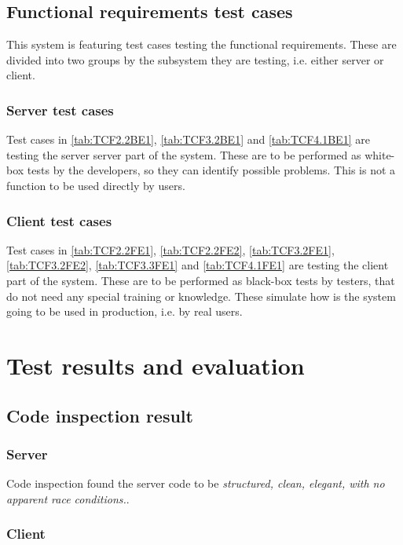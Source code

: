 \documentclass[11pt]{book}
\begin{document}
\subsection{Functional requirements test cases}

This system is featuring test cases testing the functional requirements. These are divided into two groups by the subsystem they are testing, i.e. either server or client.

\subsubsection{Server test cases}

Test cases in \ref{tab:TCF2.2BE1}, \ref{tab:TCF3.2BE1} and \ref{tab:TCF4.1BE1} are testing the server server part of the system. These are to be performed as white-box tests by the developers, so they can identify possible problems. This is not a function to be used directly by users.

\subsubsection{Client test cases} \label{sec:fe-test-cases}

Test cases in \ref{tab:TCF2.2FE1}, \ref{tab:TCF2.2FE2}, \ref{tab:TCF3.2FE1}, \ref{tab:TCF3.2FE2}, \ref{tab:TCF3.3FE1} and \ref{tab:TCF4.1FE1} are testing the client part of the system. These are to be performed as black-box tests by testers, that do not need any special training or knowledge. These simulate how is the system going to be used in production, i.e. by real users.

\section{Test results and evaluation}

\subsection{Code inspection result}

\subsubsection{Server}

Code inspection found the server code to be \emph{structured, clean, elegant, with no apparent race conditions.}.

\subsubsection{Client}
\end{document}
